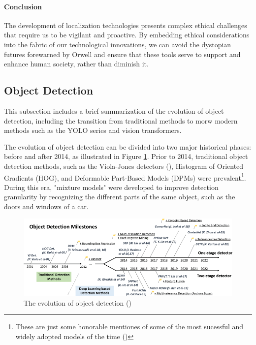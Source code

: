\paragraph{Conclusion}
The development of localization technologies presents complex ethical challenges that require us to be vigilant and proactive. By embedding ethical considerations into the fabric of our technological innovations, we can avoid the dystopian futures forewarned by Orwell and ensure that these tools serve to support and enhance human society, rather than diminish it.

\subsection{Object Detection}
This subsection includes a brief summarization of the evolution of object detection, including the transition from traditional methods to morw modern methods such as the YOLO series and vision transformers.

The evolution of object detection can be divided into two major historical phases: before and after 2014, as illustrated in Figure \ref{fig:object_detect_20_years}. Prior to 2014, traditional object detection methods, such as the Viola-Jones detectors (\cite{vi2001viola-jones-orig}), Histogram of Oriented Gradients (HOG), and Deformable Part-Based Models (DPMs) were prevalent\footnote{These are just some honorable mentiones of some of the most sucessful and widely adopted models of the time (\cite{li2012violajonessuccessful})}. During this era, "mixture models" were developed to improve detection granularity by recognizing the different parts of the same object, such as the doors and windows of a car.

\begin{figure}[H]
    \centering
    \includegraphics[width=1\linewidth]{Images/Diagrams/object_detection_20years.png}
    \caption{The evolution of object detection (\cite{zou2023object_detection_in_20_years})}
    \label{fig:object_detect_20_years}
\end{figure}

